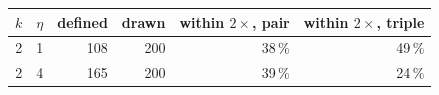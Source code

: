 \footnotesize
\begin{tabular}{rrrrrr}
\toprule
$k$ & $\eta$ & defined & drawn & within $2\times$, pair & within $2\times$, triple \\
\midrule
2 & 1 & 108 & 200 & 38\,\% & 49\,\% \\
2 & 4 & 165 & 200 & 39\,\% & 24\,\% \\
\bottomrule
\end{tabular}
